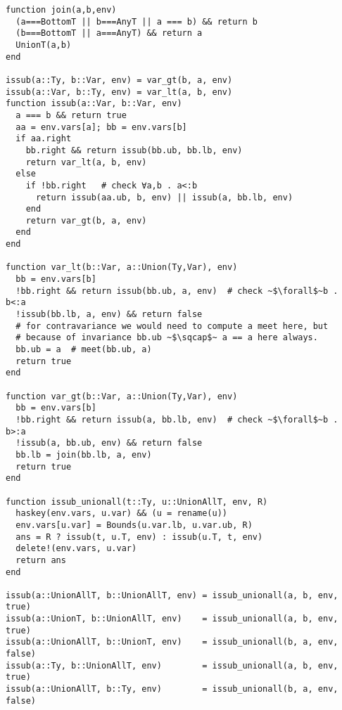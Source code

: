 \begin{singlespace}
\begin{lstlisting}[style=customjulia]
function join(a,b,env)
  (a===BottomT || b===AnyT || a === b) && return b
  (b===BottomT || a===AnyT) && return a
  UnionT(a,b)
end

issub(a::Ty, b::Var, env) = var_gt(b, a, env)
issub(a::Var, b::Ty, env) = var_lt(a, b, env)
function issub(a::Var, b::Var, env)
  a === b && return true
  aa = env.vars[a]; bb = env.vars[b]
  if aa.right
    bb.right && return issub(bb.ub, bb.lb, env)
    return var_lt(a, b, env)
  else
    if !bb.right   # check ∀a,b . a<:b
      return issub(aa.ub, b, env) || issub(a, bb.lb, env)
    end
    return var_gt(b, a, env)
  end
end

function var_lt(b::Var, a::Union(Ty,Var), env)
  bb = env.vars[b]
  !bb.right && return issub(bb.ub, a, env)  # check ~$\forall$~b . b<:a
  !issub(bb.lb, a, env) && return false
  # for contravariance we would need to compute a meet here, but
  # because of invariance bb.ub ~$\sqcap$~ a == a here always.
  bb.ub = a  # meet(bb.ub, a)
  return true
end

function var_gt(b::Var, a::Union(Ty,Var), env)
  bb = env.vars[b]
  !bb.right && return issub(a, bb.lb, env)  # check ~$\forall$~b . b>:a
  !issub(a, bb.ub, env) && return false
  bb.lb = join(bb.lb, a, env)
  return true
end

function issub_unionall(t::Ty, u::UnionAllT, env, R)
  haskey(env.vars, u.var) && (u = rename(u))
  env.vars[u.var] = Bounds(u.var.lb, u.var.ub, R)
  ans = R ? issub(t, u.T, env) : issub(u.T, t, env)
  delete!(env.vars, u.var)
  return ans
end

issub(a::UnionAllT, b::UnionAllT, env) = issub_unionall(a, b, env, true)
issub(a::UnionT, b::UnionAllT, env)    = issub_unionall(a, b, env, true)
issub(a::UnionAllT, b::UnionT, env)    = issub_unionall(b, a, env, false)
issub(a::Ty, b::UnionAllT, env)        = issub_unionall(a, b, env, true)
issub(a::UnionAllT, b::Ty, env)        = issub_unionall(b, a, env, false)

\end{lstlisting}
\end{singlespace}
